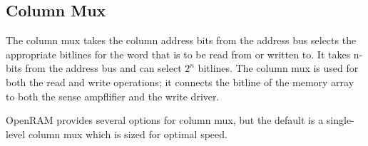 \subsection{Column Mux}
\label{sec:column_mux}
The column mux takes the column address bits from the address bus
selects the appropriate bitlines for the word that is to be read from
or written to.  It takes n-bits from the address bus and can select
$2^n$ bitlines. The column mux is used for both the read and write
operations; it connects the bitline of the memory array to both the
sense ampflifier and the write driver.

OpenRAM provides several options for column mux, but the default
is a single-level column mux which is sized for optimal speed.






